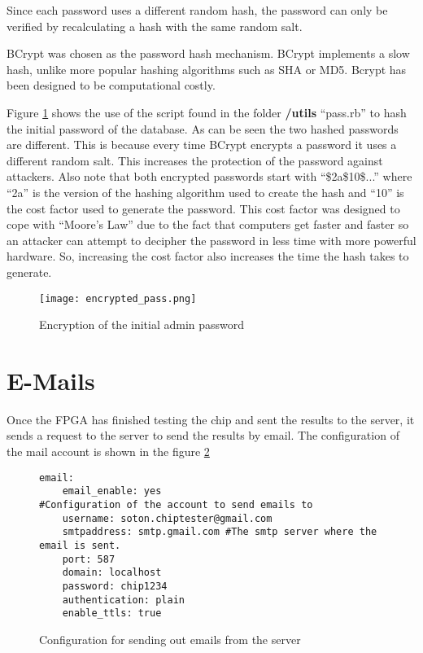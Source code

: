 Since each password uses a different random hash, the password can only be verified
by recalculating a hash with the same random salt.

BCrypt was chosen as the password hash mechanism. BCrypt implements a slow hash,
unlike more popular hashing algorithms such as SHA or MD5. Bcrypt has been designed to
be computational costly.

Figure \ref{fig:initial_pass} shows the use of the script found in the folder {\bf /utils} ``pass.rb'' to hash the initial password of the database. As can be seen the two hashed passwords are different. This is because every time BCrypt encrypts a password it uses a different random salt.
This increases the protection of the password against attackers. Also note that both encrypted passwords start with ``\$2a\$10\$...'' where ``2a'' is the version of the hashing algorithm used to create the hash and ``10'' is the cost factor used to generate the password. This cost factor
was designed to cope with ``Moore's Law'' due to the fact that computers get faster and faster so an attacker can attempt to decipher the password in less time with more powerful hardware. So, increasing the cost factor also increases the time the hash takes to generate.

\begin{figure}[htb]
\centering
\texttt{[image: encrypted\_pass.png]}
\caption{Encryption of the initial admin password}
\label{fig:initial_pass}
\end{figure}


\section{E-Mails}
Once the FPGA has finished testing the chip and sent the results to the server,
it sends a request to the server to send the results by email.
The configuration of the mail account is shown in the figure \ref{fig:email_server}

\begin{figure}[htb]
\lstset{basicstyle=\scriptsize\ttfamily}
\begin{lstlisting}
email:
    email_enable: yes
#Configuration of the account to send emails to
    username: soton.chiptester@gmail.com
    smtpaddress: smtp.gmail.com #The smtp server where the email is sent.
    port: 587
    domain: localhost
    password: chip1234
    authentication: plain
    enable_ttls: true
\end{lstlisting}
\caption{Configuration for sending out emails from the server}
\label{fig:email_server}
\end{figure}

